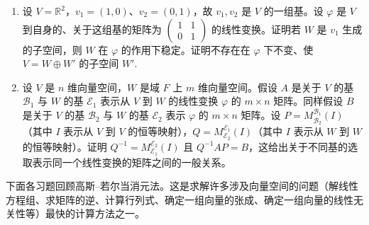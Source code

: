 \begin{enumerate}
\item 设 \(V = \mathbb{R}^2\)，\(v_1 = (1, 0)\)、\(v_2 = (0, 1)\)，故 \(v_1, v_2\) 是 \(V\) 的一组基。设 \(\varphi\) 是 \(V\) 到自身的、关于这组基的矩阵为 \(\begin{pmatrix} 1 & 1 \\ 0 & 1 \end{pmatrix}\) 的线性变换。证明若 \(W\) 是 \(v_1\) 生成的子空间，则 \(W\) 在 \(\varphi\) 的作用下稳定。证明不存在在 \(\varphi\) 下不变、使 \(V = W \oplus W'\) 的子空间 \(W'\).

\item 设 \(V\) 是 \(n\) 维向量空间，\(W\) 是域 \(F\) 上 \(m\) 维向量空间。假设 \(A\) 是关于 \(V\) 的基 \(\mathcal{B}_1\) 与 \(W\) 的基 \(\mathcal{E}_1\) 表示从 \(V\) 到 \(W\) 的线性变换 \(\varphi\) 的 \(m \times n\) 矩阵。同样假设 \(B\) 是关于 \(V\) 的基 \(\mathcal{B}_2\) 与 \(W\) 的基 \(\mathcal{E}_2\) 表示 \(\varphi\) 的 \(m \times n\) 矩阵。设 \(P = M_{\mathcal{B}_2}^{\mathcal{B}_1}(I)\)（其中 \(I\) 表示从 \(V\) 到 \(V\) 的恒等映射），\(Q = M_{\mathcal{E}_2}^{\mathcal{E}_1}(I)\)（其中 \(I\) 表示从 \(W\) 到 \(W\) 的恒等映射）。证明 \(Q^{-1} = M_{\mathcal{E}_1}^{\mathcal{E}_2}(I)\) 且 \(Q^{-1}AP = B\)，这给出关于不同基的选取表示同一个线性变换的矩阵之间的一般关系。
\end{enumerate}

\noindent 下面各习题回顾高斯--若尔当消元法。这是求解许多涉及向量空间的问题（解线性方程组、求矩阵的逆、计算行列式、确定一组向量的张成、确定一组向量的线性无关性等）最快的计算方法之一。

